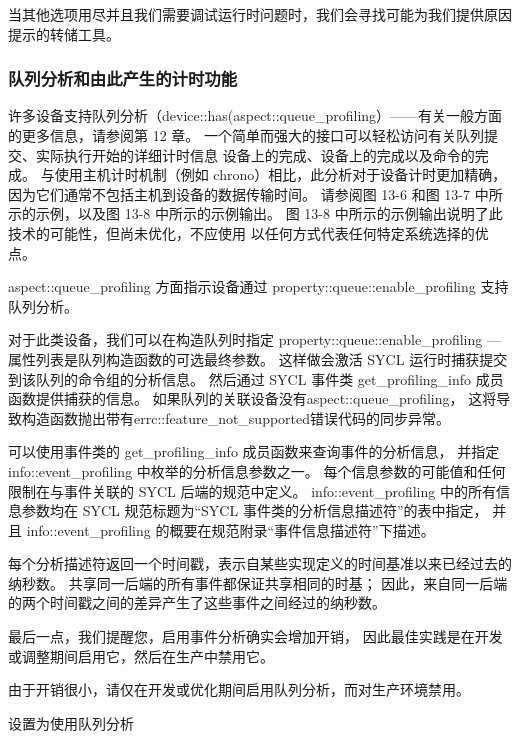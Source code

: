 \begin{remark}[调试提示]
当其他选项用尽并且我们需要调试运行时问题时，我们会寻找可能为我们提供原因提示的转储工具。
\end{remark}

\subsubsection{队列分析和由此产生的计时功能}
许多设备支持队列分析（device::has(aspect::queue\_profiling）——有关一般方面的更多信息，请参阅第 12 章。
一个简单而强大的接口可以轻松访问有关队列提交、实际执行开始的详细计时信息 设备上的完成、设备上的完成以及命令的完成。
与使用主机计时机制（例如 chrono）相比，此分析对于设备计时更加精确，因为它们通常不包括主机到设备的数据传输时间。 
请参阅图 13-6 和图 13-7 中所示的示例，以及图 13-8 中所示的示例输出。
图 13-8 中所示的示例输出说明了此技术的可能性，但尚未优化，不应使用 以任何方式代表任何特定系统选择的优点。

aspect::queue\_profiling 方面指示设备通过 property::queue::enable\_profiling 支持队列分析。

对于此类设备，我们可以在构造队列时指定 property::queue::enable\_profiling — 
属性列表是队列构造函数的可选最终参数。 这样做会激活 SYCL 运行时捕获提交到该队列的命令组的分析信息。 
然后通过 SYCL 事件类 get\_profiling\_info 成员函数提供捕获的信息。 
如果队列的关联设备没有aspect::queue\_profiling，
这将导致构造函数抛出带有errc::feature\_not\_supported错误代码的同步异常。

可以使用事件类的 get\_profiling\_info 成员函数来查询事件的分析信息，
并指定 info::event\_profiling 中枚举的分析信息参数之一。 
每个信息参数的可能值和任何限制在与事件关联的 SYCL 后端的规范中定义。 
info::event\_profiling 中的所有信息参数均在 SYCL 规范标题为“SYCL 事件类的分析信息描述符”的表中指定，
并且 info::event\_profiling 的概要在规范附录“事件信息描述符”下描述。

每个分析描述符返回一个时间戳，表示自某些实现定义的时间基准以来已经过去的纳秒数。 
共享同一后端的所有事件都保证共享相同的时基； 
因此，来自同一后端的两个时间戳之间的差异产生了这些事件之间经过的纳秒数。

最后一点，我们提醒您，启用事件分析确实会增加开销，
因此最佳实践是在开发或调整期间启用它，然后在生产中禁用它。

\begin{remark}
	由于开销很小，请仅在开发或优化期间启用队列分析，而对生产环境禁用。
\end{remark}

{\color{red} 设置为使用队列分析}

